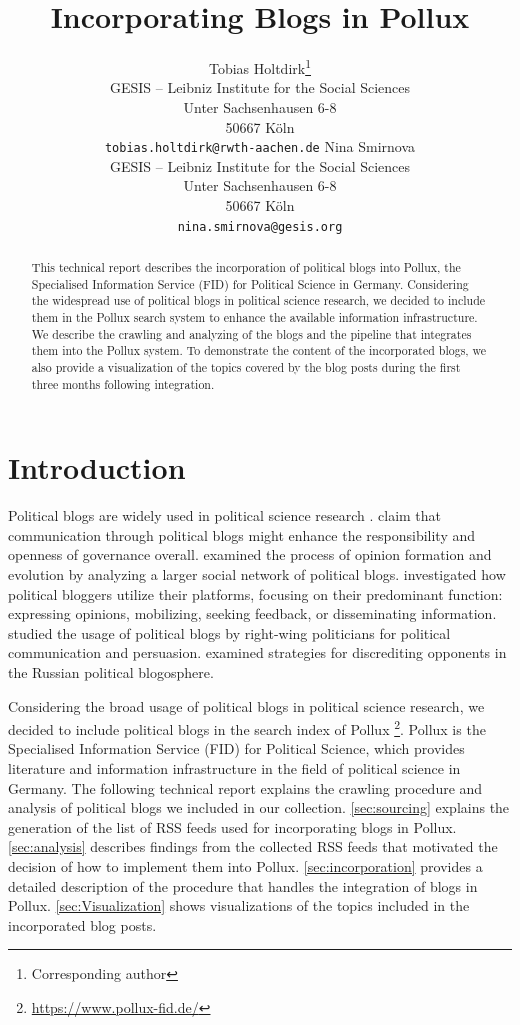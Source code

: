 \documentclass{article}
\title{Incorporating Blogs in Pollux}
\author{Tobias Holtdirk\thanks{Corresponding author}\\
    GESIS -- Leibniz Institute for the Social Sciences\\
    Unter Sachsenhausen 6-8 \\
    50667 Köln \\
    \texttt{tobias.holtdirk@rwth-aachen.de}
    \And 
    Nina Smirnova\\
    GESIS -- Leibniz Institute for the Social Sciences\\
    Unter Sachsenhausen 6-8 \\
    50667 Köln \\
    \texttt{nina.smirnova@gesis.org}
}
\newcommand{\Autoref}[1]{%
  \begingroup%
  \def\chapterautorefname{Chapter}%
  \def\sectionautorefname{Section}%
  \def\subsectionautorefname{Subsection}%
  \autoref{#1}%
  \endgroup%
}
\begin{document}
\maketitle

\begin{abstract}
    This technical report describes the incorporation of political blogs into Pollux, the Specialised Information Service (FID) for Political Science in Germany. Considering the widespread use of political blogs in political science research, we decided to include them in the Pollux search system to enhance the available information infrastructure. We describe the crawling and analyzing of the blogs and the pipeline that integrates them into the Pollux system. To demonstrate the content of the incorporated blogs, we also provide a visualization of the topics covered by the blog posts during the first three months following integration.
\end{abstract}



\section{Introduction}
Political blogs are widely used in political science research \citep{wallsten_agenda_2007, coleman_political_2008, wallsten_political_2008, guner_political_2009, akinnubi_deliberative_2023, peng_role_2023}. \citet{coleman_political_2008} claim that communication through political blogs might enhance the responsibility and openness of governance overall. \citet{peng_role_2023} examined the process of opinion formation and evolution by analyzing a larger social network of political blogs. \citet{wallsten_political_2008} investigated how political bloggers utilize their platforms, focusing on their predominant function: expressing opinions, mobilizing, seeking feedback, or disseminating information. \citet{demasi_analysing_2020} studied the usage of political blogs by right-wing politicians for political communication and persuasion. \citet{balakhonskaya_communicative_2020} examined strategies for discrediting opponents in the Russian political blogosphere.

Considering the broad usage of political blogs in political science research, we decided to include political blogs in the search index of Pollux \footnote{\url{https://www.pollux-fid.de/}}. Pollux is the Specialised Information Service (FID) for Political Science, which provides literature and information infrastructure in the field of political science in Germany. The following technical report explains the crawling procedure and analysis of political blogs we included in our collection. \Autoref{sec:sourcing} explains the generation of the list of RSS feeds used for incorporating blogs in Pollux. \Autoref{sec:analysis} describes findings from the collected RSS feeds that motivated the decision of how to implement them into Pollux. \Autoref{sec:incorporation} provides a detailed description of the procedure that handles the integration of blogs in Pollux. \Autoref{sec:Visualization} shows visualizations of the topics included in the incorporated blog posts.
\end{document}
